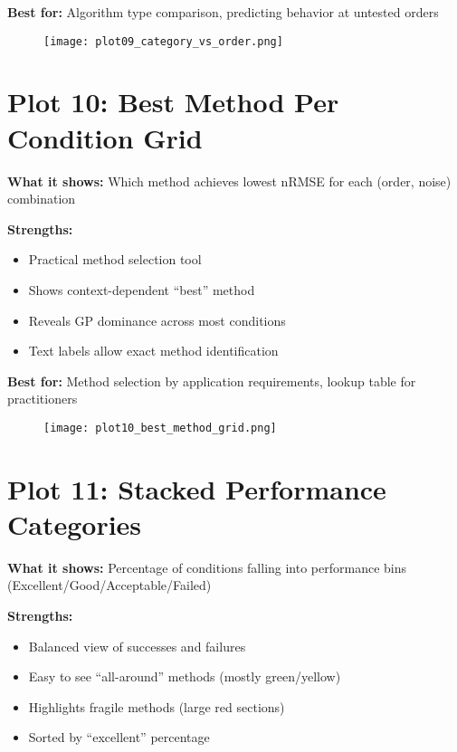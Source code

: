 \documentclass[11pt]{article}
\begin{document}
\textbf{Best for:} Algorithm type comparison, predicting behavior at untested orders

\begin{figure}[h]
\centering
\texttt{[image: plot09\_category\_vs\_order.png]}
\end{figure}

\clearpage


\section*{Plot 10: Best Method Per Condition Grid}

\textbf{What it shows:} Which method achieves lowest nRMSE for each (order, noise) combination

\textbf{Strengths:}
\begin{itemize}
    \item Practical method selection tool
    \item Shows context-dependent ``best'' method
    \item Reveals GP dominance across most conditions
    \item Text labels allow exact method identification
\end{itemize}

\textbf{Best for:} Method selection by application requirements, lookup table for practitioners

\begin{figure}[h]
\centering
\texttt{[image: plot10\_best\_method\_grid.png]}
\end{figure}

\clearpage


\section*{Plot 11: Stacked Performance Categories}

\textbf{What it shows:} Percentage of conditions falling into performance bins (Excellent/Good/Acceptable/Failed)

\textbf{Strengths:}
\begin{itemize}
    \item Balanced view of successes and failures
    \item Easy to see ``all-around'' methods (mostly green/yellow)
    \item Highlights fragile methods (large red sections)
    \item Sorted by ``excellent'' percentage
\end{itemize}
\end{document}
